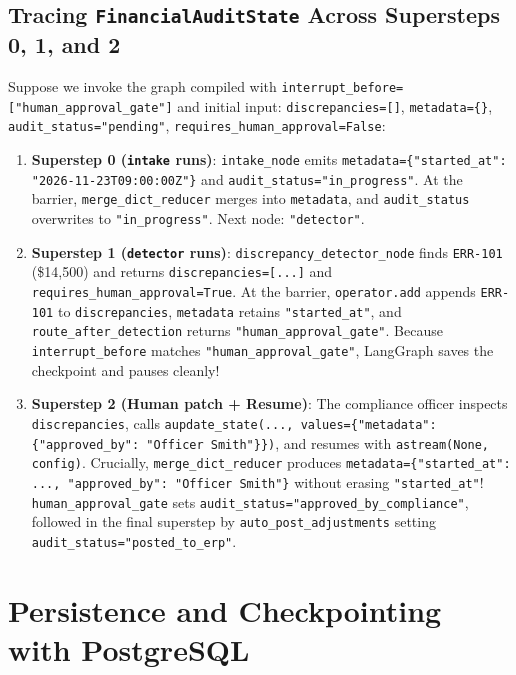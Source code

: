 \subsection{Tracing \texttt{FinancialAuditState} Across Supersteps 0, 1, and 2}
Suppose we invoke the graph compiled with \texttt{interrupt\_before=["human\_approval\_gate"]} and initial input:
\texttt{discrepancies=[]}, \texttt{metadata=\{\}}, \texttt{audit\_status="pending"}, \texttt{requires\_human\_approval=False}:
\begin{enumerate}[leftmargin=18pt]
  \item \textbf{Superstep 0 (\texttt{intake} runs)}: \texttt{intake\_node} emits \texttt{metadata=\{"started\_at": "2026-11-23T09:00:00Z"\}} and \texttt{audit\_status="in\_progress"}. At the barrier, \texttt{merge\_dict\_reducer} merges into \texttt{metadata}, and \texttt{audit\_status} overwrites to \texttt{"in\_progress"}. Next node: \texttt{"detector"}.
  \item \textbf{Superstep 1 (\texttt{detector} runs)}: \texttt{discrepancy\_detector\_node} finds \texttt{ERR-101} (\$14,500) and returns \texttt{discrepancies=[...]} and \texttt{requires\_human\_approval=True}. At the barrier, \texttt{operator.add} appends \texttt{ERR-101} to \texttt{discrepancies}, \texttt{metadata} retains \texttt{"started\_at"}, and \texttt{route\_after\_detection} returns \texttt{"human\_approval\_gate"}. Because \texttt{interrupt\_before} matches \texttt{"human\_approval\_gate"}, LangGraph saves the checkpoint and pauses cleanly!
  \item \textbf{Superstep 2 (Human patch + Resume)}: The compliance officer inspects \texttt{discrepancies}, calls \texttt{aupdate\_state(..., values=\{"metadata": \{"approved\_by": "Officer Smith"\}\})}, and resumes with \texttt{astream(None, config)}. Crucially, \texttt{merge\_dict\_reducer} produces \texttt{metadata=\{"started\_at": ..., "approved\_by": "Officer Smith"\}} without erasing \texttt{"started\_at"}! \texttt{human\_approval\_gate} sets \texttt{audit\_status="approved\_by\_compliance"}, followed in the final superstep by \texttt{auto\_post\_adjustments} setting \texttt{audit\_status="posted\_to\_erp"}.
\end{enumerate}

\section{Persistence and Checkpointing with PostgreSQL}

